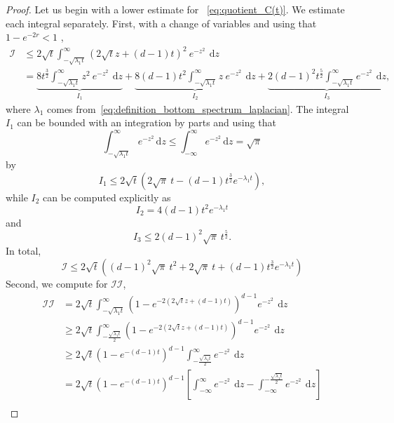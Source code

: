 \documentclass[10pt,a4paper]{amsart}
\def\d{\,\mathrm{d}}
\begin{document}
\begin{proof}
	Let us begin with a lower estimate  for ~\eqref{eq:quotient_C(t)}.
	We estimate each integral separately. First, with a change of variables and using that $1-e^{-2r}<1$ ,
	\[
	\begin{aligned}
		\mathcal{I} &\leq  2\sqrt{t}\int_{-\sqrt{\lambda_1 t}}^\infty \left(2\sqrt{t}z + (d-1)t\right)^2 \ e^{-z^2}\ \d z\\[10pt]
		& = \underbrace{8t^\frac{3}{2}\int_{-\sqrt{\lambda_1 t}}^\infty z^2 \ e^{-z^2}\ \d z}_{I_1} + \underbrace{8(d-1)t^2 \int_{-\sqrt{\lambda_1 t}}^\infty z \ e^{-z^2}\ \d z}_{I_2} + \underbrace{2 (d-1)^2 t^\frac{5}{2} \int_{-\sqrt{\lambda_1 t}}^\infty  e^{-z^2}\ \d z}_{I_3},
	\end{aligned}
	\]
	where $\lambda_1$ comes from~\eqref{eq:definition_bottom_spectrum_laplacian}. The integral $I_1$ can be bounded with an integration by parts and using that
	\[
	\int_{-\sqrt{\lambda_1 t}}^\infty e^{-z^2}\d z\leq  \int_{-\infty}^\infty e^{-z^2}\d z = \sqrt{\pi}
	\]
	by
	\[
	I_1\leq 2\sqrt{t}\left(2\sqrt{\pi}\ t - (d-1)t^\frac{3}{2}e^{-\lambda_1 t}  \right),
	\]
	while $I_2$ can be computed explicitly as
	\[
	I_2 = 4(d-1)t^2 e^{-\lambda_1 t}
	\]
	and
	\[
	I_3 \leq 2 (d-1)^2 \sqrt{\pi}\  t^\frac{5}{2}.
	\]
	In total,
	\[
	\mathcal{I}\leq 2\sqrt{t}\left((d-1)^2\sqrt{\pi}\ t^2  +2\sqrt{\pi}\ t  + (d-1)t^\frac{3}{2}e^{-\lambda_1 t} \right)
	\]
	Second, we compute for $\mathcal{II}$,
	\[
	\begin{aligned}
		\mathcal{II} &= 2\sqrt{t} \int_{-\sqrt{\lambda_1 t}}^{\infty} \left(1- e^{-2(2\sqrt{t}z+(d-1)t)}\right)^{d-1} e^{-z^2}\ \d z\\[10pt]
		&\geq 2\sqrt{t} \int_{-\frac{\sqrt{\lambda_1 t}}{2}}^{\infty} \left(1- e^{-2(2\sqrt{t}z+(d-1)t)}\right)^{d-1} e^{-z^2}\ \d z\\[10pt]
		& \geq  2\sqrt{t} \left(1- e^{-(d-1)t}\right)^{d-1} \int_{-\frac{\sqrt{\lambda_1 t}}{2}}^{\infty}  e^{-z^2}\ \d z\\[10pt]
		&= 2\sqrt{t} \left(1- e^{-(d-1)t}\right)^{d-1}\left[ \int_{-\infty}^{\infty}  e^{-z^2}\ \d z - \int_{-\infty}^{-\frac{\sqrt{\lambda_1 t}}{2}}  e^{-z^2}\ \d z \right]\\[10pt]

\end{aligned}\]
\end{proof}
\end{document}
